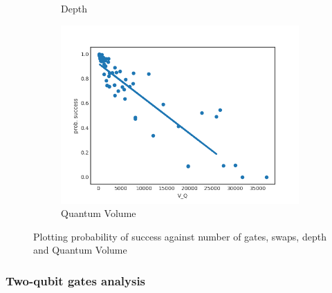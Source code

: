 \documentclass[11pt]{article}
\begin{document}
\begin{figure}[H]
\begin{subfigure}[b]{0.5\linewidth}
    \caption{Depth} 
    \label{fig:ps_d_3000_0} 
  \end{subfigure}%
  \begin{subfigure}[b]{0.5\linewidth}
    \centering
    \includegraphics[width=0.75\linewidth]{ps_q_3000_0} 
    \caption{Quantum Volume} 
    \label{fig:ps_q_3000_0} 
  \end{subfigure} 
  \caption{Plotting probability of success against number of gates, swaps, depth and Quantum Volume}
  \label{fig:ps_3000_0} 
\end{figure}

\subsubsection{Two-qubit gates analysis}
\label{sec:orgcebdc30}
\end{document}
